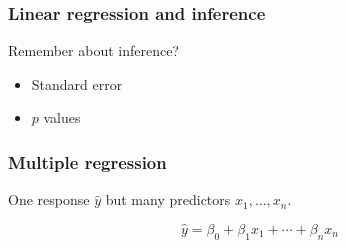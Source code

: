 \begin{frame}
  \frametitle{Linear regression and inference}

  Remember about inference?

  \begin{itemize}
  \item Standard error
  \item $p$ values
  \end{itemize}
  
  
\end{frame}

\begin{frame}
  \frametitle{Multiple regression}

  One response $\hat y$ but many predictors $x_1, \dotsc, x_n$.

  \begin{displaymath}
    \hat y = \beta_0 + \beta_1 x_1 + \dotsb + \beta_n x_n
  \end{displaymath}


\end{frame}


